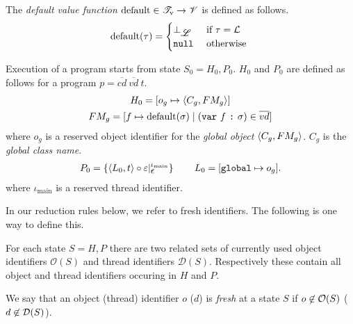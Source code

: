 \begin{definition}
  The \emph{default value function} $\mbox{$\mathrm{default}$} \in \mathscr{T}_{\text{v}} \to \mathscr{V}$ is
  defined as follows.
  \begin{equation*}
    \mbox{$\mathrm{default}$}(\tau) =
    \begin{cases}
      \bot_{\mbox{$\mathscr{L}$}} & \text{ if } \tau = \mbox{$\mathcal{L}$} \\
      \mbox{\mdseries\texttt{null}}        & \text{ otherwise } 
    \end{cases}
  \end{equation*}
\end{definition}

\begin{definition} \label{def:state_zero}
  Execution of a program starts from state $S_0 = H_0, P_0$. $H_0$ and
  $P_0$ are defined as follows for a program $p =
  \overline{cd}~\overline{vd}~t$.
  \begin{equation*}
    \begin{gathered}
      H_0 = [o_g \mapsto \mbox{$\langle C_g, FM_g \rangle$}] \\
      FM_g = [f \mapsto \mbox{$\mathrm{default}$}(\sigma) \mid (\mbox{\mdseries\texttt{var}~$f$~\texttt{:}~$\sigma$}) \in \overline{vd}]
    \end{gathered}
  \end{equation*}
  where $o_g$ is a reserved object identifier for the \emph{global object} $\mbox{$\langle C_g,
  FM_g \rangle$}$. $C_g$ is the \emph{global class name}.  
  \begin{equation*}
    \begin{gathered}
      P_0 = \left\{ \mbox{$\langle L_0, t \rangle$} \circ \varepsilon
      |_{\mbox{$\epsilon$}}^{\iota_{\text{main}}} \right\} \quad\quad
      L_0 = [ \mbox{\mdseries\texttt{global}} \mapsto o_g ].
    \end{gathered}
  \end{equation*}
  where $\iota_{\text{main}}$ is a reserved thread identifier.
\end{definition}

In our reduction rules below, we refer to fresh identifiers. The following is
one way to define this. 
\begin{definition}
  For each state $S = H, P$ there are two related sets of currently used object
  identifiers $\mathcal{O}(S)$ and thread identifiers $\mathcal{D}(S)$.
  Respectively these contain all object and thread identifiers occuring in $H$
  and $P$. 
  
  We say that an object (thread) identifier $o$ ($d$) is \emph{fresh} at a state $S$ if
  $o \not\in \mathcal{O}(S)$ ($d \not\in \mathcal{D}(S)$).
\end{definition}

